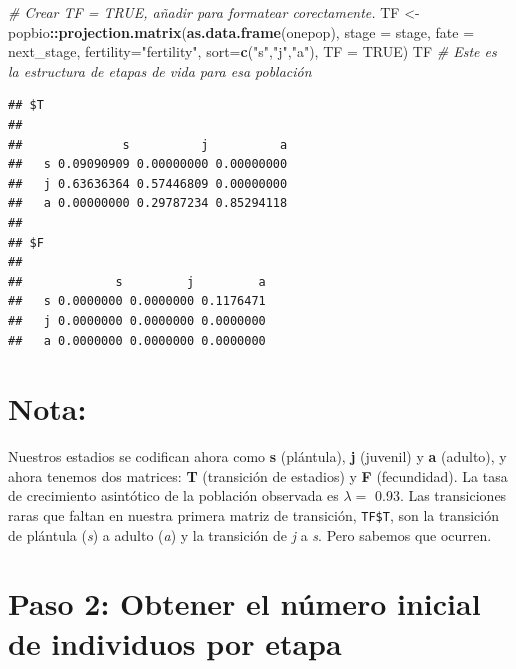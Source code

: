 \documentclass[
]{book}
\newenvironment{Shaded}{\begin{snugshade}}{\end{snugshade}}
\newcommand{\AttributeTok}[1]{\textcolor[rgb]{0.13,0.29,0.53}{#1}}
\newcommand{\CommentTok}[1]{\textcolor[rgb]{0.56,0.35,0.01}{\textit{#1}}}
\newcommand{\ConstantTok}[1]{\textcolor[rgb]{0.56,0.35,0.01}{#1}}
\newcommand{\FunctionTok}[1]{\textcolor[rgb]{0.13,0.29,0.53}{\textbf{#1}}}
\newcommand{\NormalTok}[1]{#1}
\newcommand{\OtherTok}[1]{\textcolor[rgb]{0.56,0.35,0.01}{#1}}
\newcommand{\SpecialCharTok}[1]{\textcolor[rgb]{0.81,0.36,0.00}{\textbf{#1}}}
\newcommand{\StringTok}[1]{\textcolor[rgb]{0.31,0.60,0.02}{#1}}
\theoremstyle{definition}
\theoremstyle{definition}
\theoremstyle{definition}
\theoremstyle{definition}
\theoremstyle{remark}
\begin{document}
\begin{Shaded}
\begin{Highlighting}[]
\CommentTok{\# Crear TF = TRUE, añadir para formatear corectamente.}
\NormalTok{TF }\OtherTok{\textless{}{-}}\NormalTok{ popbio}\SpecialCharTok{::}\FunctionTok{projection.matrix}\NormalTok{(}\FunctionTok{as.data.frame}\NormalTok{(onepop), }
                        \AttributeTok{stage =}\NormalTok{ stage, }\AttributeTok{fate =}\NormalTok{ next\_stage, }
                        \AttributeTok{fertility=}\StringTok{"fertility"}\NormalTok{, }\AttributeTok{sort=}\FunctionTok{c}\NormalTok{(}\StringTok{"s"}\NormalTok{,}\StringTok{"j"}\NormalTok{,}\StringTok{"a"}\NormalTok{), }\AttributeTok{TF =} \ConstantTok{TRUE}\NormalTok{)}
\NormalTok{TF }\CommentTok{\# Este es la estructura de etapas de vida para esa población }
\end{Highlighting}
\end{Shaded}

\begin{verbatim}
## $T
##    
##              s          j          a
##   s 0.09090909 0.00000000 0.00000000
##   j 0.63636364 0.57446809 0.00000000
##   a 0.00000000 0.29787234 0.85294118
## 
## $F
##    
##             s         j         a
##   s 0.0000000 0.0000000 0.1176471
##   j 0.0000000 0.0000000 0.0000000
##   a 0.0000000 0.0000000 0.0000000
\end{verbatim}

\hypertarget{nota}{%
\section{Nota:}\label{nota}}

Nuestros estadios se codifican ahora como \textbf{s} (plántula), \textbf{j}
(juvenil) y \textbf{a} (adulto), y ahora tenemos dos matrices: \textbf{T}
(transición de estadios) y \textbf{F} (fecundidad). La tasa de crecimiento
asintótico de la población observada es \(\lambda =\)
0.93. Las transiciones raras que
faltan en nuestra primera matriz de transición, \texttt{TF\$T}, son la
transición de plántula (\emph{s}) a adulto (\emph{a}) y la transición de \emph{j} a
\emph{s}. Pero sabemos que ocurren.

\hypertarget{paso-2-obtener-el-nuxfamero-inicial-de-individuos-por-etapa}{%
\section{Paso 2: Obtener el número inicial de individuos por etapa}\label{paso-2-obtener-el-nuxfamero-inicial-de-individuos-por-etapa}}
\end{document}
